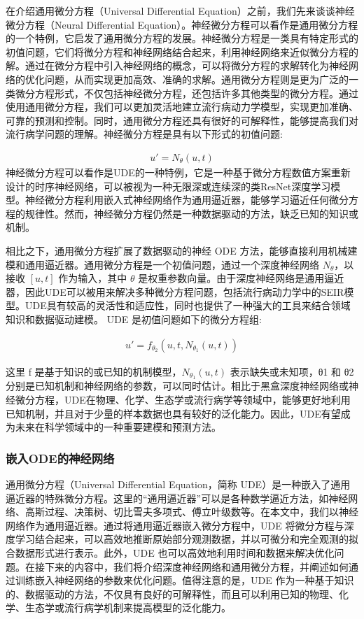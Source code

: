 在介绍通用微分方程（Universal Differential Equation）之前，我们先来谈谈神经微分方程（Neural Differential Equation）。神经微分方程可以看作是通用微分方程的一个特例，它启发了通用微分方程的发展。神经微分方程是一类具有特定形式的初值问题，它们将微分方程和神经网络结合起来，利用神经网络来近似微分方程的解。通过在微分方程中引入神经网络的概念，可以将微分方程的求解转化为神经网络的优化问题，从而实现更加高效、准确的求解。通用微分方程则是更为广泛的一类微分方程形式，不仅包括神经微分方程，还包括许多其他类型的微分方程。通过使用通用微分方程，我们可以更加灵活地建立流行病动力学模型，实现更加准确、可靠的预测和控制。同时，通用微分方程还具有很好的可解释性，能够提高我们对流行病学问题的理解。神经微分方程是具有以下形式的初值问题:

\begin{gather}
    u'=N_\theta(u,t)
\end{gather}
神经微分方程可以看作是UDE的一种特例，它是一种基于微分方程数值方案重新设计的时序神经网络，可以被视为一种无限深或连续深的类ResNet深度学习模型。神经微分方程利用嵌入式神经网络作为通用逼近器，能够学习逼近任何微分方程的规律性。然而，神经微分方程仍然是一种数据驱动的方法，缺乏已知的知识或机制。

相比之下，通用微分方程扩展了数据驱动的神经 ODE 方法，能够直接利用机械建模和通用逼近器。通用微分方程是一个初值问题，通过一个深度神经网络 $N_\theta$，以接收 $[u, t]$ 作为输入，其中 $\theta$ 是权重参数向量。由于深度神经网络是通用逼近器，因此UDE可以被用来解决多种微分方程问题，包括流行病动力学中的SEIR模型。UDE具有较高的灵活性和适应性，同时也提供了一种强大的工具来结合领域知识和数据驱动建模。 UDE 是初值问题如下的微分方程组:

\begin{gather}
    u'=f_{\theta_2}(u,t,N_{\theta_1}(u,t))
\end{gather}

这里 f 是基于知识的或已知的机制模型，$N_{\theta_1}(u,t)$ 表示缺失或未知项，θ1 和 θ2 分别是已知机制和神经网络的参数，可以同时估计。相比于黑盒深度神经网络或神经微分方程，UDE在物理、化学、生态学或流行病学等领域中，能够更好地利用已知机制，并且对于少量的样本数据也具有较好的泛化能力。因此，UDE有望成为未来在科学领域中的一种重要建模和预测方法。

\subsubsection{嵌入ODE的神经网络}
通用微分方程（Universal Differential Equation，简称 UDE）是一种嵌入了通用逼近器的特殊微分方程。这里的“通用逼近器”可以是各种数学逼近方法，如神经网络、高斯过程、决策树、切比雪夫多项式、傅立叶级数等。在本文中，我们以神经网络作为通用逼近器。通过将通用逼近器嵌入微分方程中，UDE 将微分方程与深度学习结合起来，可以高效地推断原始部分观测数据，并以可微分和完全观测的拟合数据形式进行表示。此外，UDE 也可以高效地利用时间和数据来解决优化问题。在接下来的内容中，我们将介绍深度神经网络和通用微分方程，并阐述如何通过训练嵌入神经网络的参数来优化问题。值得注意的是，UDE 作为一种基于知识的、数据驱动的方法，不仅具有良好的可解释性，而且可以利用已知的物理、化学、生态学或流行病学机制来提高模型的泛化能力。

